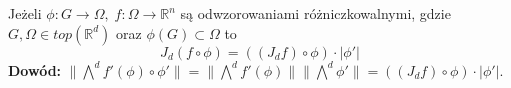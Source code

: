 \begin{lem}
	Jeżeli $\phi: G \rightarrow \Omega, \; f: \Omega \rightarrow \mathbb{R}^n$ są odwzorowaniami różniczkowalnymi, gdzie $G, \Omega \in top(\mathbb{R}^d)$ oraz $\phi(G) \subset \Omega$ to $$
		J_d (f \circ \phi) = ((J_df) \circ \phi) \cdot |\phi'| 
	$$
	\textbf{Dowód:}\newline
	$\| \bigwedge^d f'(\phi) \circ \phi' \| = \| \bigwedge^d f'(\phi) \| \| \bigwedge^d \phi' \| = ((J_df) \circ \phi) \cdot |\phi'|$. 
\end{lem}